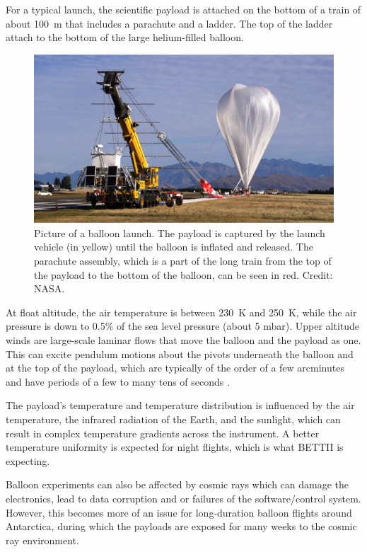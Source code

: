 For a typical launch, the scientific payload is attached on the bottom of a train of about \SI{100}{\meter} that includes a parachute and a ladder. The top of the ladder attach to the bottom of the large helium-filled balloon. 
\begin{figure}[!ht]
	\centering
	\includegraphics[width=\textwidth]{Figures/balloonLaunch.png} 
	\caption[Balloon launch]{Picture of a balloon launch. The payload is captured by the launch vehicle (in yellow) until the balloon is inflated and released. The parachute assembly, which is a part of the long train from the top of the payload to the bottom of the balloon, can be seen in red. Credit: NASA.}
	\label{fig:BalloonLaunch}
    \end{figure}





At float altitude, the air temperature is between \SI{230}{\kelvin} and \SI{250}{\kelvin}, while the air pressure is down to 0.5\% of the sea level pressure (about 5 mbar). Upper altitude winds are large-scale laminar flows that move the balloon and the payload as one. This can excite pendulum motions about the pivots underneath the balloon and at the top of the payload, which are typically of the order of a few arcminutes and have periods of a few to many tens of seconds \citep{Fixsen:1996kha}.

The payload's temperature and temperature distribution is influenced by the air temperature, the infrared radiation of the Earth, and the sunlight, which can result in complex temperature gradients across the instrument. A better temperature uniformity is expected for night flights, which is what BETTII is expecting.

Balloon experiments can also be affected by cosmic rays which can damage the electronics, lead to data corruption and or failures of the software/control system. However, this becomes more of an issue for long-duration balloon flights around Antarctica, during which the payloads are exposed for many weeks to the cosmic ray environment.

